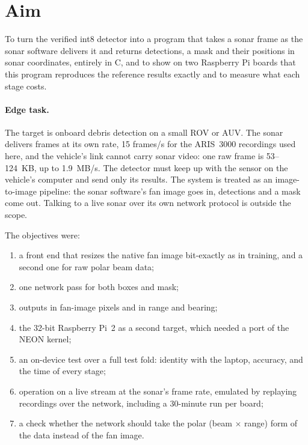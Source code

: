 \documentclass[11pt,a4paper]{article}
\begin{document}
\section{Aim}

To turn the verified int8 detector into a program that takes a sonar frame
as the sonar software delivers it and returns detections, a mask and their
positions in sonar coordinates, entirely in C, and to show on two
Raspberry Pi boards that this program reproduces the reference results
exactly and to measure what each stage costs.

\paragraph{Edge task.} The target is onboard debris detection on a small
ROV or AUV. The sonar delivers frames at its own rate, 15 frames/s for the
ARIS~3000 recordings used here, and the vehicle's link cannot carry sonar
video: one raw frame is 53--124~KB, up to 1.9~MB/s. The detector must keep
up with the sensor on the vehicle's computer and send only its results. The
system is treated as an image-to-image pipeline: the sonar software's fan
image goes in, detections and a mask come out. Talking to a live sonar over
its own network protocol is outside the scope.

The objectives were:
\begin{enumerate}
  \item a front end that resizes the native fan image bit-exactly as in
        training, and a second one for raw polar beam data;
  \item one network pass for both boxes and mask;
  \item outputs in fan-image pixels and in range and bearing;
  \item the 32-bit Raspberry Pi~2 as a second target, which needed a port
        of the NEON kernel;
  \item an on-device test over a full test fold: identity with the laptop,
        accuracy, and the time of every stage;
  \item operation on a live stream at the sonar's frame rate, emulated by
        replaying recordings over the network, including a 30-minute run per
        board;
  \item a check whether the network should take the polar (beam $\times$
        range) form of the data instead of the fan image.
\end{enumerate}
\end{document}
